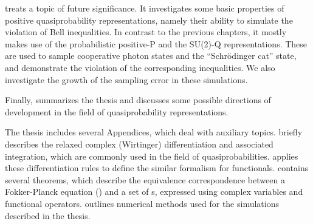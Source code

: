  treats a topic of future significance.
It investigates some basic properties of positive quasiprobability representations, namely their ability to simulate the violation of Bell inequalities.
In contrast to the previous chapters, it mostly makes use of the probabilistic positive-P and the SU(2)-Q representations.
These are used to sample cooperative photon states and the ``Schr\"odinger cat'' state, and demonstrate the violation of the corresponding inequalities.
We also investigate the growth of the sampling error in these simulations.

Finally,  summarizes the thesis and discusses some possible directions of development in the field of quasiprobability representations.

The thesis includes several Appendices, which deal with auxiliary topics.
 briefly describes the relaxed complex (Wirtinger) differentiation and associated integration, which are commonly used in the field of quasiprobabilities.
 applies these differentiation rules to define the similar formalism for functionals.
 contains several theorems, which describe the equivalence correspondence between a Fokker-Planck equation () and a set of s, expressed using complex variables and functional operators.
 outlines numerical methods used for the simulations described in the thesis.

